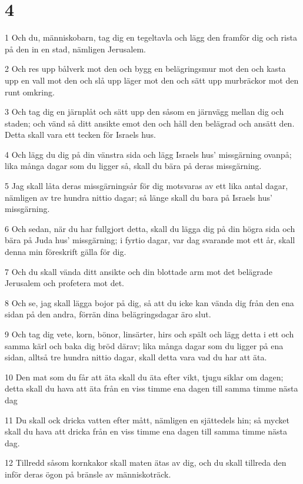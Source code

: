 \chapter{4}

\par 1 Och du, människobarn, tag dig en tegeltavla och lägg den framför dig och rista på den in en stad, nämligen Jerusalem.
\par 2 Och res upp bålverk mot den och bygg en belägringsmur mot den och kasta upp en vall mot den och slå upp läger mot den och sätt upp murbräckor mot den runt omkring.
\par 3 Och tag dig en järnplåt och sätt upp den såsom en järnvägg mellan dig och staden; och vänd så ditt ansikte emot den och håll den belägrad och ansätt den. Detta skall vara ett tecken för Israels hus.
\par 4 Och lägg du dig på din vänstra sida och lägg Israels hus' missgärning ovanpå; lika många dagar som du ligger så, skall du bära på deras missgärning.
\par 5 Jag skall låta deras missgärningsår för dig motsvaras av ett lika antal dagar, nämligen av tre hundra nittio dagar; så länge skall du bara på Israels hus' missgärning.
\par 6 Och sedan, när du har fullgjort detta, skall du lägga dig på din högra sida och bära på Juda hus' missgärning; i fyrtio dagar, var dag svarande mot ett år, skall denna min föreskrift gälla för dig.
\par 7 Och du skall vända ditt ansikte och din blottade arm mot det belägrade Jerusalem och profetera mot det.
\par 8 Och se, jag skall lägga bojor på dig, så att du icke kan vända dig från den ena sidan på den andra, förrän dina belägringsdagar äro slut.
\par 9 Och tag dig vete, korn, bönor, linsärter, hirs och spält och lägg detta i ett och samma kärl och baka dig bröd därav; lika många dagar som du ligger på ena sidan, alltså tre hundra nittio dagar, skall detta vara vad du har att äta.
\par 10 Den mat som du får att äta skall du äta efter vikt, tjugu siklar om dagen; detta skall du hava att äta från en viss timme ena dagen till samma timme nästa dag
\par 11 Du skall ock dricka vatten efter mått, nämligen en sjättedels hin; så mycket skall du hava att dricka från en viss timme ena dagen till samma timme nästa dag.
\par 12 Tillredd såsom kornkakor skall maten ätas av dig, och du skall tillreda den inför deras ögon på bränsle av människoträck.
